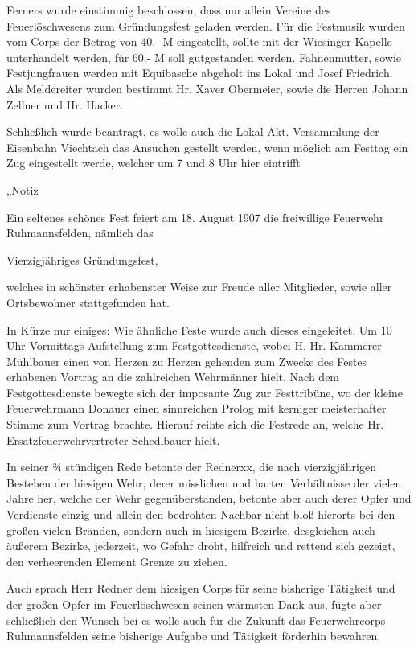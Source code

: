 \documentclass[12pt,a4paper]{book}
\begin{document}
Ferners wurde einstimmig beschlossen, dass nur allein Vereine des
Feuerlöschwesens zum Gründungsfest geladen werden. Für die Festmusik wurden vom
Corps der Betrag von 40.- M eingestellt, sollte mit der Wiesinger Kapelle
unterhandelt werden, für 60.- M soll gutgestanden werden. Fahnenmutter, sowie
Festjungfrauen werden mit Equibasche abgeholt ins Lokal und Josef Friedrich. Als
Meldereiter wurden bestimmt Hr. Xaver Obermeier, sowie die Herren Johann Zellner
und Hr. Hacker.

Schließlich wurde beantragt, es wolle auch die Lokal Akt. Versammlung der
Eisenbahn Viechtach das Ansuchen gestellt werden, wenn möglich am Festtag ein
Zug eingestellt werde, welcher um 7 und 8 Uhr hier eintrifft

„Notiz

Ein seltenes schönes Fest feiert am 18. August 1907 die freiwillige Feuerwehr
Ruhmannsfelden, nämlich das

Vierzigjähriges Gründungsfest,

welches in schönster erhabenster Weise zur Freude aller Mitglieder, sowie aller
Ortsbewohner stattgefunden hat.

In Kürze nur einiges: Wie ähnliche Feste wurde auch dieses eingeleitet. Um 10
Uhr Vormittags Aufstellung zum Festgottesdienste, wobei H. Hr. Kammerer
Mühlbauer einen von Herzen zu Herzen gehenden zum Zwecke des Festes erhabenen
Vortrag an die zahlreichen Wehrmänner hielt. Nach dem Festgottesdienste bewegte
sich der imposante Zug zur Festtribüne, wo der kleine Feuerwehrmann Donauer
einen sinnreichen Prolog mit kerniger meisterhafter Stimme zum Vortrag brachte.
Hierauf reihte sich die Festrede an, welche Hr. Ersatzfeuerwehrvertreter
Schedlbauer hielt.

In seiner ¾ stündigen Rede betonte der Rednerxx, die nach vierzigjährigen
Bestehen der hiesigen Wehr, derer misslichen und harten Verhältnisse der vielen
Jahre her, welche der Wehr gegenüberstanden, betonte aber auch derer Opfer und
Verdienste einzig und allein den bedrohten Nachbar nicht bloß hierorts bei den
großen vielen Bränden, sondern auch in hiesigem Bezirke, desgleichen auch
äußerem Bezirke, jederzeit, wo Gefahr droht, hilfreich und rettend sich gezeigt,
den verheerenden Element Grenze zu ziehen.

Auch sprach Herr Redner dem hiesigen Corps für seine bisherige Tätigkeit und der
großen Opfer im Feuerlöschwesen seinen wärmsten Dank aus, fügte aber schließlich
den Wunsch bei es wolle auch für die Zukunft das Feuerwehrcorps Ruhmannsfelden
seine bisherige Aufgabe und Tätigkeit förderhin bewahren.
\end{document}
